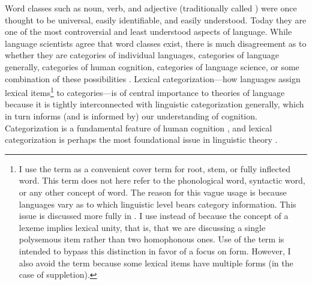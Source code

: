 Word classes such as noun, verb, and adjective (traditionally called ) were once thought to be universal, easily identifiable, and easily understood. Today they are one of the most controversial and least understood aspects of language. While language scientists agree that word classes exist, there is much disagreement as to whether they are categories of individual languages, categories of language generally, categories of human cognition, categories of language science, or some combination of these possibilities \parencites[166]{Mithun2017}{Haspelmath2018}{Hieberfc}. Lexical categorization—how languages assign lexical items\footnote{I use the term  as a convenient cover term for root, stem, or fully inflected word. This term does not here refer to the phonological word, syntactic word, or any other concept of word. The reason for this vague usage is because languages vary as to which linguistic level bears category information. This issue is discussed more fully in . I use  instead of  because the concept of a lexeme implies lexical unity, that is, that we are discussing a single polysemous item rather than two homophonous ones. Use of the term  is intended to bypass this distinction in favor of a focus on form. However, I also avoid the term  because some lexical items have multiple forms (in the case of suppletion).} to categories—is of central importance to theories of language because it is tightly interconnected with linguistic categorization generally, which in turn informs (and is informed by) our understanding of cognition. Categorization is a fundamental feature of human cognition \parencites[xi]{Taylor2003}[2--3]{LierRijkhoff2013}, and lexical categorization is perhaps the most foundational issue in linguistic theory \parencites[36]{Croft1991}[1]{VapnarskyVeneziano2017b}.

